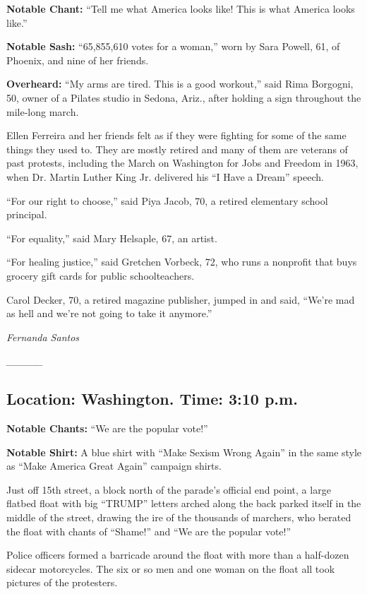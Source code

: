 \textbf{Notable Chant:} ``Tell me what America looks like! This is what
America looks like.''

\textbf{Notable Sash:} ``65,855,610 votes for a woman,'' worn by Sara
Powell, 61, of Phoenix, and nine of her friends.

\textbf{Overheard:} ``My arms are tired. This is a good workout,'' said
Rima Borgogni, 50, owner of a Pilates studio in Sedona, Ariz., after
holding a sign throughout the mile-long march.

Ellen Ferreira and her friends felt as if they were fighting for some of
the same things they used to. They are mostly retired and many of them
are veterans of past protests, including the March on Washington for
Jobs and Freedom in 1963, when Dr. Martin Luther King Jr. delivered his
``I Have a Dream'' speech.

``For our right to choose,'' said Piya Jacob, 70, a retired elementary
school principal.

``For equality,'' said Mary Helsaple, 67, an artist.

``For healing justice,'' said Gretchen Vorbeck, 72, who runs a nonprofit
that buys grocery gift cards for public schoolteachers.

Carol Decker, 70, a retired magazine publisher, jumped in and said,
``We're mad as hell and we're not going to take it anymore.''

\emph{Fernanda Santos}

\emph{\_\_\_\_\_}

\hypertarget{location-washington-time-310-pm}{%
\subsection{Location: Washington. Time: 3:10
p.m.}\label{location-washington-time-310-pm}}

\textbf{Notable Chants:} ``We are the popular vote!''

\textbf{Notable Shirt:} A blue shirt with ``Make Sexism Wrong Again'' in
the same style as ``Make America Great Again'' campaign shirts.

Just off 15th street, a block north of the parade's official end point,
a large flatbed float with big ``TRUMP'' letters arched along the back
parked itself in the middle of the street, drawing the ire of the
thousands of marchers, who berated the float with chants of ``Shame!''
and ``We are the popular vote!''

Police officers formed a barricade around the float with more than a
half-dozen sidecar motorcycles. The six or so men and one woman on the
float all took pictures of the protesters.

